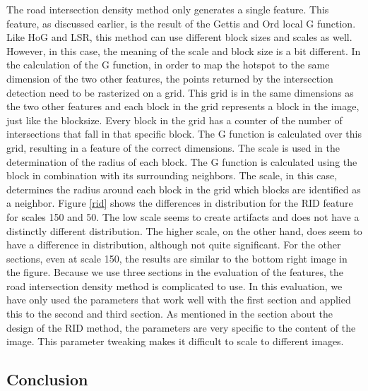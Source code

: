 The road intersection density method only generates a single feature. This feature, as discussed earlier, is the result of the Gettis and Ord local G function. Like HoG and LSR, this method can use different block sizes and scales as well. However, in this case, the meaning of the scale and block size is a bit different. In the calculation of the G function, in order to map the hotspot to the same dimension of the two other features, the points returned by the intersection detection need to be rasterized on a grid. This grid is in the same dimensions as the two other features and each block in the grid represents a block in the image, just like the blocksize. Every block in the grid has a counter of the number of intersections that fall in that specific block. The G function is calculated over this grid, resulting in a feature of the correct dimensions. The scale is used in the determination of the radius of each block. The G function is calculated using the block in combination with its surrounding neighbors. The scale, in this case, determines the radius around each block in the grid which blocks are identified as a neighbor.\newline\newline
\noindent
Figure \ref{rid} shows the differences in distribution for the RID feature for scales 150 and 50. The low scale seems to create artifacts and does not have a distinctly different distribution. The higher scale, on the other hand, does seem to have a difference in distribution, although not quite significant. For the other sections, even at scale 150, the results are similar to the bottom right image in the figure. Because we use three sections in the evaluation of the features, the road intersection density method is complicated to use. In this evaluation, we have only used the parameters that work well with the first section and applied this to the second and third section. As mentioned in the section about the design of the RID method, the parameters are very specific to the content of the image. This parameter tweaking makes it difficult to scale to different images.

\subsection{Conclusion}

